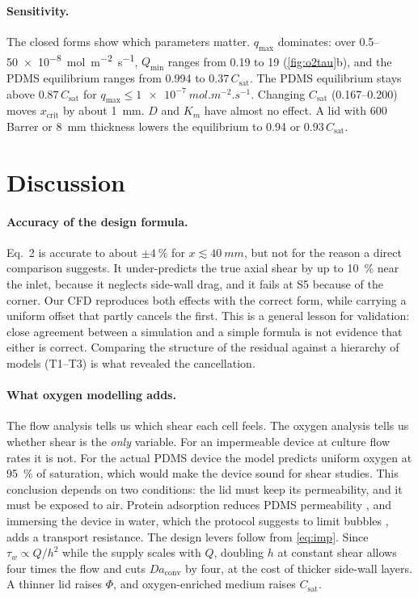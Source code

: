 \documentclass[11pt,a4paper]{article}
\newcommand{\Csat}{C_{\mathrm{sat}}}
\newcommand{\qmax}{q_{\max}}
\newcommand{\Km}{K_{m}}
\newcommand{\taw}{\tau_{w}}
\newcommand{\Da}{\mathit{Da}}
\begin{document}
\paragraph{Sensitivity.} The closed forms show which parameters matter. $\qmax$ dominates: over 0.5--\SI{50e-8}{mol.m^{-2}.s^{-1}}, $Q_{\min}$ ranges from 0.19 to \SI{19}{\uLmin} (\cref{fig:o2tau}b), and the PDMS equilibrium ranges from 0.994 to $0.37\,\Csat$. The PDMS equilibrium stays above $0.87\,\Csat$ for $\qmax\le\SI{1e-7}{mol.m^{-2}.s^{-1}}$. Changing $\Csat$ (0.167--0.200) moves $x_{\mathrm{crit}}$ by about \SI{1}{mm}. $D$ and $\Km$ have almost no effect. A lid with 600 Barrer or \SI{8}{mm} thickness lowers the equilibrium to 0.94 or $0.93\,\Csat$.

\section{Discussion}

\paragraph{Accuracy of the design formula.} Eq.~2 is accurate to about $\pm\SI{4}{\percent}$ for $x\lesssim\SI{40}{mm}$, but not for the reason a direct comparison suggests. It under-predicts the true axial shear by up to \SI{10}{\percent} near the inlet, because it neglects side-wall drag, and it fails at S5 because of the corner. Our CFD reproduces both effects with the correct form, while carrying a uniform offset that partly cancels the first. This is a general lesson for validation: close agreement between a simulation and a simple formula is not evidence that either is correct. Comparing the structure of the residual against a hierarchy of models (T1--T3) is what revealed the cancellation.

\paragraph{What oxygen modelling adds.} The flow analysis tells us which shear each cell feels. The oxygen analysis tells us whether shear is the \emph{only} variable. For an impermeable device at culture flow rates it is not. For the actual PDMS device the model predicts uniform oxygen at \SI{95}{\percent} of saturation, which would make the device sound for shear studies. This conclusion depends on two conditions: the lid must keep its permeability, and it must be exposed to air. Protein adsorption reduces PDMS permeability \citep{Mehta2007}, and immersing the device in water, which the protocol suggests to limit bubbles \citep{Delon2020}, adds a transport resistance. The design levers follow from \cref{eq:imp}. Since $\taw\propto Q/h^2$ while the supply scales with $Q$, doubling $h$ at constant shear allows four times the flow and cuts $\Da_{\mathrm{conv}}$ by four, at the cost of thicker side-wall layers. A thinner lid raises $\Phi$, and oxygen-enriched medium raises $\Csat$.
\end{document}
